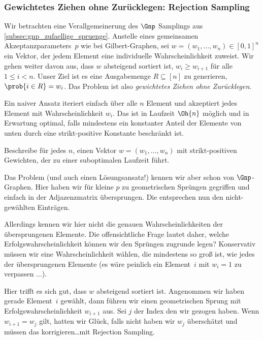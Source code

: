 \subsubsection{Gewichtetes Ziehen ohne Zurücklegen: Rejection Sampling}
Wir betrachten eine Verallgemeinerung des $\Gnp$ Samplings aus \cref{subsec:gnp_zufaellige_spruenge}.
Anstelle eines gemeinsamen Akzeptanzparameters~$p$ wie bei Gilbert-Graphen, sei $w = (w_1, \ldots, w_n) \in [0, 1]^n$ ein Vektor, der jedem Element eine individuelle Wahrscheinlichkeit zuweist.
Wir gehen weiter davon aus, dass $w$ absteigend sortiert ist, \dh $w_i \ge w_{i+1}$ für alle $1 \le i < n$.
Unser Ziel ist es eine Ausgabemenge $R \subseteq [n]$ zu generieren, \sd $\prob{i \in R} = w_i$.
Das Problem ist also \emph{gewichtetes Ziehen ohne Zurücklegen}.

Ein naiver Ansatz iteriert einfach über alle $n$ Element und akzeptiert jedes Element mit Wahrscheinlichkeit $w_i$.
Das ist in Laufzeit $\Oh{n}$ möglich und in Erwartung optimal, falls mindestens ein konstanter Anteil der Elemente von unten durch eine strikt-positive Konstante beschränkt ist.
\begin{exercise}
    Beschreibe für jedes $n$, einen Vektor $w = (w_1, \ldots, w_n)$ mit strikt-positiven Gewichten, der zu einer suboptimalen Laufzeit führt.
\end{exercise}

Das Problem (und auch einen Lösungsansatz!) kennen wir aber schon von $\Gnp$-Graphen.
Hier haben wir für kleine $p$ zu geometrischen Sprüngen gegriffen und einfach  in der Adjazenzmatrix übersprungen.
Die  entsprechen nun den nicht-gewählten Einträgen.

Allerdings kennen wir hier nicht die genauen Wahrscheinlichkeiten der übersprungenen Elemente.
Die offensichtliche Frage lautet daher, welche Erfolgswahrscheinlichkeit können wir den Sprüngen zugrunde legen?
Konservativ müssen wir eine Wahrscheinlichkeit wählen, die mindestens so groß ist, wie jedes der übersprungenen Elemente (es wäre peinlich ein Element~$i$ mit $w_i = 1$ zu verpassen ...).

Hier trifft es sich gut, dass $w$ absteigend sortiert ist.
Angenommen wir haben gerade Element~$i$ gewählt, dann führen wir einen geometrischen Sprung mit Erfolgswahrscheinlichkeit $w_{i+1}$ aus.
Sei $j$ der Index den wir gezogen haben.
Wenn $w_{i+1} = w_j$ gilt, hatten wir Glück, falls nicht haben wir $w_j$ überschätzt und müssen das korrigieren\ldots \zB mit Rejection Sampling.

